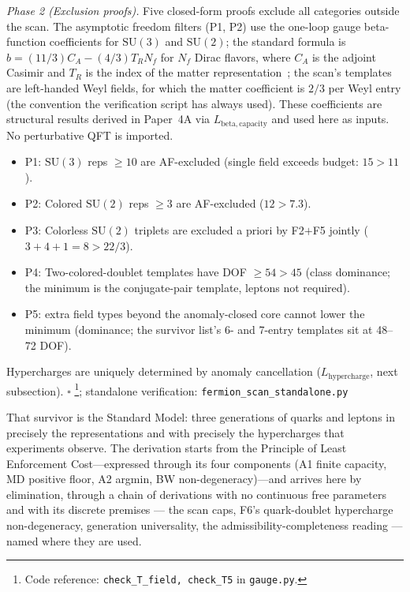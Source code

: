 \documentclass[11pt]{article}
\newenvironment{varlist}{\begin{itemize}[nosep,leftmargin=2em]}{\end{itemize}}
\newcommand{\coderef}[2]{\footnote{Code reference: \texttt{#1} in \texttt{#2}.}}
\newcommand{\SU}{\mathrm{SU}}
\begin{document}
\begin{tcolorbox}[apfbox, title={Theorem $T_{\mathrm{field}}$ (SM Fermion Content)}]
\textit{Phase 2 (Exclusion proofs).}  Five closed-form proofs exclude all categories outside the scan.  The asymptotic freedom filters (P1, P2) use the one-loop gauge beta-function coefficients for $\SU(3)$ and $\SU(2)$; the standard formula is $b = (11/3)C_A - (4/3)T_R N_f$ for $N_f$ Dirac flavors, where $C_A$ is the adjoint Casimir and $T_R$ is the index of the matter representation~\cite{PeskinSchroeder1995}; the scan's templates are left-handed Weyl fields, for which the matter coefficient is $2/3$ per Weyl entry (the convention the verification script has always used).  These coefficients are structural results derived in Paper~4A via $L_{\mathrm{beta,capacity}}$ and used here as inputs.  No perturbative QFT is imported.
\begin{varlist}
\item P1: $\SU(3)$ reps $\ge 10$ are AF-excluded (single field exceeds budget: $15 > 11$).
\item P2: Colored $\SU(2)$ reps $\ge 3$ are AF-excluded ($12 > 7.3$).
\item P3: Colorless $\SU(2)$ triplets are excluded a priori by F2$+$F5 jointly ($3 + 4 + 1 = 8 > 22/3$).
\item P4: Two-colored-doublet templates have DOF $\ge 54 > 45$ (class dominance; the minimum is the conjugate-pair template, leptons not required).
\item P5: extra field types beyond the anomaly-closed core cannot lower the minimum (dominance; the survivor list's 6- and 7-entry templates sit at 48--72 DOF).
\end{varlist}

Hypercharges are uniquely determined by anomaly cancellation ($L_{\mathrm{hypercharge}}$, next subsection).  $\square$
\coderef{check\_T\_field, check\_T5}{gauge.py}; standalone verification: \texttt{fermion\_scan\_standalone.py}~\cite{BrookeFermionScan}
\end{tcolorbox}

That survivor is the Standard Model: three generations of quarks and leptons in precisely the representations and with precisely the hypercharges that experiments observe.  The derivation starts from the Principle of Least Enforcement Cost---expressed through its four components (A1 finite capacity, MD positive floor, A2 argmin, BW non-degeneracy)---and arrives here by elimination, through a chain of derivations with no continuous free parameters and with its discrete premises --- the scan caps, F6's quark-doublet hypercharge non-degeneracy, generation universality, the admissibility-completeness reading --- named where they are used.
\end{document}
